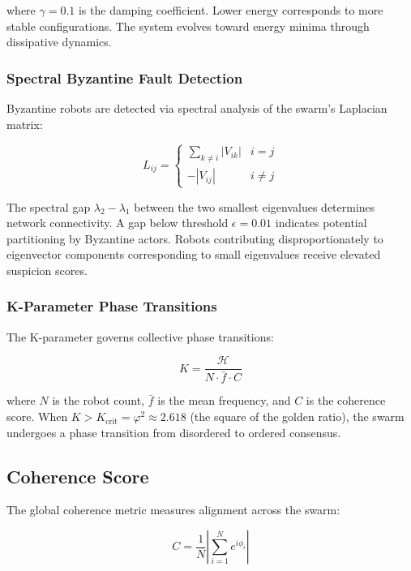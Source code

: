 \documentclass[11pt,a4paper,twocolumn]{article}
\begin{document}
\noindent where $\gamma = 0.1$ is the damping coefficient. Lower energy corresponds
to more stable configurations. The system evolves toward energy minima through
dissipative dynamics.

\subsubsection{Spectral Byzantine Fault Detection}

Byzantine robots are detected via spectral analysis of the swarm's Laplacian matrix:

\begin{equation}
L_{ij} = \begin{cases}
    \sum_{k \neq i} |V_{ik}| & i = j \\
    -|V_{ij}| & i \neq j
\end{cases}
\end{equation}

The spectral gap $\lambda_2 - \lambda_1$ between the two smallest eigenvalues
determines network connectivity. A gap below threshold $\epsilon = 0.01$ indicates
potential partitioning by Byzantine actors. Robots contributing disproportionately
to eigenvector components corresponding to small eigenvalues receive elevated
suspicion scores.

\subsubsection{K-Parameter Phase Transitions}

The K-parameter governs collective phase transitions:

\begin{equation}
K = \frac{\mathcal{H}}{N \cdot \bar{f} \cdot C}
\end{equation}

\noindent where $N$ is the robot count, $\bar{f}$ is the mean frequency, and
$C$ is the coherence score. When $K > K_{\text{crit}} = \varphi^2 \approx 2.618$
(the square of the golden ratio), the swarm undergoes a phase transition from
disordered to ordered consensus.

\subsection{Coherence Score}

The global coherence metric measures alignment across the swarm:

\begin{equation}
C = \frac{1}{N} \left| \sum_{i=1}^{N} e^{i\phi_i} \right|
\end{equation}
\end{document}
